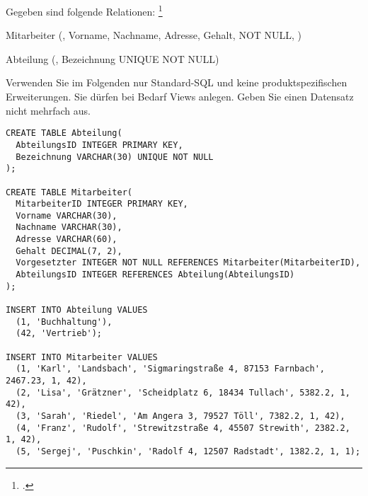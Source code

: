 \documentclass{bschlangaul-aufgabe}
\begin{document}

Gegeben sind folgende Relationen:
\footcite{examen:66116:2021:03}

\begin{bRelationenModell}
Mitarbeiter (, Vorname, Nachname, Adresse,
Gehalt,  NOT NULL, )

\bigskip

Abteilung (, Bezeichnung UNIQUE NOT NULL)
\end{bRelationenModell}

Verwenden Sie im Folgenden nur Standard-SQL und keine
produktspezifischen Erweiterungen. Sie dürfen bei Bedarf Views anlegen.
Geben Sie einen Datensatz nicht mehrfach aus.

\begin{verbatim}
CREATE TABLE Abteilung(
  AbteilungsID INTEGER PRIMARY KEY,
  Bezeichnung VARCHAR(30) UNIQUE NOT NULL
);

CREATE TABLE Mitarbeiter(
  MitarbeiterID INTEGER PRIMARY KEY,
  Vorname VARCHAR(30),
  Nachname VARCHAR(30),
  Adresse VARCHAR(60),
  Gehalt DECIMAL(7, 2),
  Vorgesetzter INTEGER NOT NULL REFERENCES Mitarbeiter(MitarbeiterID),
  AbteilungsID INTEGER REFERENCES Abteilung(AbteilungsID)
);

INSERT INTO Abteilung VALUES
  (1, 'Buchhaltung'),
  (42, 'Vertrieb');

INSERT INTO Mitarbeiter VALUES
  (1, 'Karl', 'Landsbach', 'Sigmaringstraße 4, 87153 Farnbach', 2467.23, 1, 42),
  (2, 'Lisa', 'Grätzner', 'Scheidplatz 6, 18434 Tullach', 5382.2, 1, 42),
  (3, 'Sarah', 'Riedel', 'Am Angera 3, 79527 Töll', 7382.2, 1, 42),
  (4, 'Franz', 'Rudolf', 'Strewitzstraße 4, 45507 Strewith', 2382.2, 1, 42),
  (5, 'Sergej', 'Puschkin', 'Radolf 4, 12507 Radstadt', 1382.2, 1, 1);

\end{verbatim}
\end{document}
